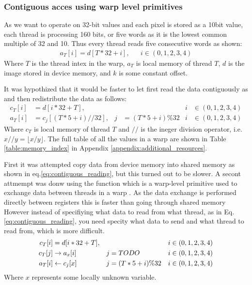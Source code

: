 \subsubsection{Contiguous acces using warp level primitives} \label{sec:contuguous_access}
As we want to operate on 32-bit values and each pixel is stored as a 10bit value, each thread is processing 160 bits, or five words as it is the lowest common multiple of 32 and 10.
Thus every thread reads five consecutive words as shown:
\begin{align}
    a_T[i] = d[T*32+i], &  & i \in (0,1,2,3,4)
\end{align}
Where $T$ is the thread intex in the warp, $a_T$ is local memory of thread $T$, $d$ is the image stored in device memory, and $k$ is some constant offset.

It was hypothized that it would be faster to let first read the data contiguously as and then redistribute the data as follows:
\begin{align}
    c_T[i] & = d[i*32+T],        &   &                 & i & \in (0,1,2,3,4) \\
    a_T[i] & = c_j[(T*5+i)//32], & j & = (T*5 + i)\%32 & i & \in (0,1,2,3,4)
    \label{eq:contiguous_reading}
\end{align}
Where $c_T$ is local memory of thread $T$ and $//$ is the ineger division operator, i.e. $x//y = \lfloor x/y \rfloor$.
The full table of all the values in a warp are shown in Table \ref{table:memory_index} in Appendix \ref{appendix:additional_resources}.

First it was attempted copy data from device memory into shared memory as shown in eq.\ref{eq:contiguous_reading}, but this turned out to be slower.
A secont attmempt was donw using the  function which is a warp-level primitive used to exchange data between threads in a warp \cite{linUsingCUDAWarpLevel2018}.
As the data exchange is performed directly between registers this is faster than going through shared memory \cite{linUsingCUDAWarpLevel2018}
However instead of specifiying what data to read from what thread, as in Eq. \ref{eq:contiguous_reading}, you need specity what data to send and what thread to read from, which is more difficult.
\begin{align}
    c_T[i] & = d[i*32+T],       &   &                 & i & \in (0,1,2,3,4) \\
    c_T[j] & \rightarrow a_x[i] & j & = TODO         & i & \in (0,1,2,3,4) \\
    a_T[i] & \leftarrow c_j[x]  & j & = (T*5 + i)\%32 & i & \in (0,1,2,3,4)
    \label{eq:contiguous_reading_shfl}
\end{align}
Where $x$ represents some locally unknown variable.

